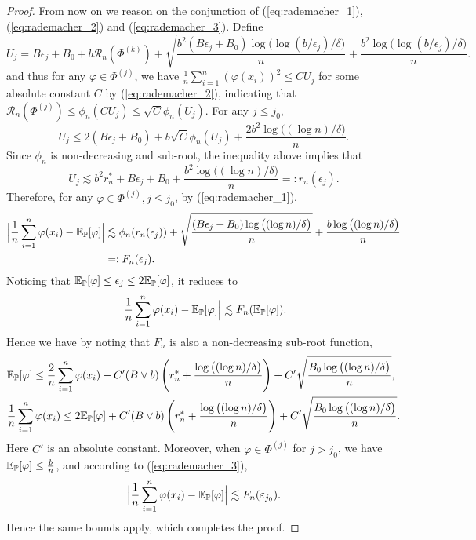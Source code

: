 \documentclass[11pt]{article}
\numberwithin{equation}{section}
\renewcommand{\P}{\mathbb{P}}
\renewcommand{\eqref}[1]{(\ref{#1})}
\begin{document}
\begin{proof}
    From now on we reason on the conjunction of \eqref{eq:rademacher_1}, \eqref{eq:rademacher_2} and \eqref{eq:rademacher_3}.
    Define 
    \begin{equation}\label{eq:def_u}
        U_j = B\epsilon_j+B_0+b\mathcal{R}_n(\Phi^{(k)})+\sqrt{\frac{b^2(B\epsilon_j+B_0)\log\big(\log(b/\epsilon_j)/\delta\big)}{n}} + \frac{b^2\log\big(\log(b/\epsilon_j)/\delta\big)}{n}.
    \end{equation}
    and thus for any $\varphi\in\Phi^{(j)}$, we have $\frac{1}{n}\sum_{i=1}^n(\varphi(x_i))^2\leq CU_j$ for some absolute constant $C$ by \eqref{eq:rademacher_2}, indicating that
    $\mathcal{R}_n(\Phi^{(j)})\leq \phi_n(CU_j)\leq \sqrt{C}\phi_n(U_j)$.
    For any $j\leq j_0$,
    \begin{equation}
        U_j \leq 2(B\epsilon_j+B_0)+b\sqrt{C}\phi_n(U_j)+\frac{2b^2\log\big((\log n)/\delta\big)}{n}.
    \end{equation}
    Since $\phi_n$ is non-decreasing and sub-root, the inequality above implies that
    \begin{equation}
        U_j \lesssim b^2r_n^*+B\epsilon_j+B_0+\frac{b^2\log\big((\log n)/\delta\big)}{n}=:r_n(\epsilon_j).
    \end{equation}
    Therefore, for any $\varphi\in\Phi^{(j)},j\leq j_0$, by \eqref{eq:rademacher_1},
    \begin{equation}
        \begin{aligned}
            \Big|\frac{1}{n}\sum_{i=1}^n\varphi(x_i)-\E_\P[\varphi]\Big| 
            &\lesssim \phi_n(r_n(\epsilon_j))+\sqrt{\frac{(B\epsilon_j+B_0)\log\big((\log n)/\delta\big)}{n}}+\frac{b\log\big((\log n)/\delta\big)}{n} \\
            &=: F_n(\epsilon_j).
        \end{aligned}
    \end{equation}
    Noticing that $\E_\P[\varphi]\leq \epsilon_j\leq 2\E_\P[\varphi]$, it reduces to
    \begin{equation}
        \Big|\frac{1}{n}\sum_{i=1}^n\varphi(x_i)-\E_\P[\varphi]\Big|\lesssim F_n(\E_\P[\varphi]).
    \end{equation}
    Hence we have by noting that $F_n$ is also a non-decreasing sub-root function, 
    \begin{align}
        &\E_\P[\varphi]\leq \frac{2}{n}\sum_{i=1}^n\varphi(x_i) + C'(B\vee b)\left(r_n^* + \frac{\log\big((\log n)/\delta\big)}{n}\right)+C'\sqrt{\frac{B_0\log\big((\log n)/\delta\big)}{n}},\\
        &\frac{1}{n}\sum_{i=1}^n\varphi(x_i)\leq 2\E_\P[\varphi]+C'(B\vee b)\left(r_n^* + \frac{\log\big((\log n)/\delta\big)}{n}\right)+C'\sqrt{\frac{B_0\log\big((\log n)/\delta\big)}{n}}.
    \end{align}
    Here $C'$ is an absolute constant. Moreover, when $\varphi\in\Phi^{(j)}$ for $j>j_0$, we have $\E_\P[\varphi]\leq \frac{b}{n}$, and according to \eqref{eq:rademacher_3},
    \begin{equation}
        \Big|\frac{1}{n}\sum_{i=1}^n\varphi(x_i)-\E_\P[\varphi]\Big|\lesssim F_n(\varepsilon_{j_0}).
    \end{equation}
    Hence the same bounds apply, which completes the proof.
\end{proof}
\end{document}

